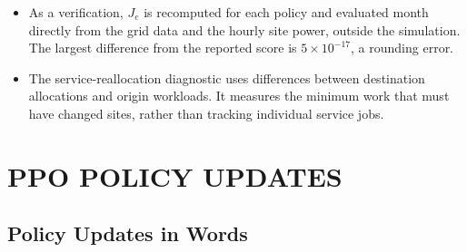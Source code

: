 \documentclass{UNCC-thesis}
\newcommand{\codepath}[1]{{\Urlmuskip=0mu plus 1mu\relax\nolinkurl{#1}}}
\begin{document}
\begin{itemize}
        \codepath{docs/figures/ppo_mw/mw_results.json} and draws Figure~\ref{fig:test-mw}.
    \item As a verification, \(J_e\) is recomputed for each policy and evaluated month directly
        from the grid data and the hourly site power, outside the simulation. The largest
        difference from the reported score is \(5\times10^{-17}\), a rounding error.
  \item The service-reallocation diagnostic uses differences between
        destination allocations and origin workloads. It measures the
        minimum work that must have changed sites, rather than tracking
        individual service jobs.
\end{itemize}

\chapter{PPO POLICY UPDATES}
\label{subsec:ppo-details}

\section{Policy Updates in Words}
\end{document}
